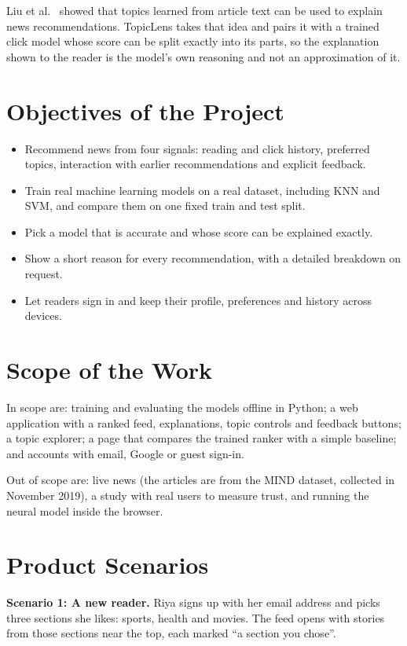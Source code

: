 \documentclass[12pt,a4paper,oneside]{report}
\begin{document}
Liu et al.\ \cite{liu2024} showed that topics learned from article text can be used to explain news
recommendations. TopicLens takes that idea and pairs it with a trained click model whose score can be
split exactly into its parts, so the explanation shown to the reader is the model's own reasoning and
not an approximation of it.

\section{Objectives of the Project}
\begin{itemize}
  \item Recommend news from four signals: reading and click history, preferred topics, interaction with
        earlier recommendations and explicit feedback.
  \item Train real machine learning models on a real dataset, including KNN and SVM, and compare them on
        one fixed train and test split.
  \item Pick a model that is accurate and whose score can be explained exactly.
  \item Show a short reason for every recommendation, with a detailed breakdown on request.
  \item Let readers sign in and keep their profile, preferences and history across devices.
\end{itemize}

\section{Scope of the Work}
In scope are: training and evaluating the models offline in Python; a web application with a ranked feed,
explanations, topic controls and feedback buttons; a topic explorer; a page that compares the trained
ranker with a simple baseline; and accounts with email, Google or guest sign-in.

Out of scope are: live news (the articles are from the MIND dataset, collected in November 2019), a
study with real users to measure trust, and running the neural model inside the browser.

\section{Product Scenarios}
\textbf{Scenario 1: A new reader.} Riya signs up with her email address and picks three sections she
likes: sports, health and movies. The feed opens with stories from those sections near the top, each
marked ``a section you chose''.
\end{document}
